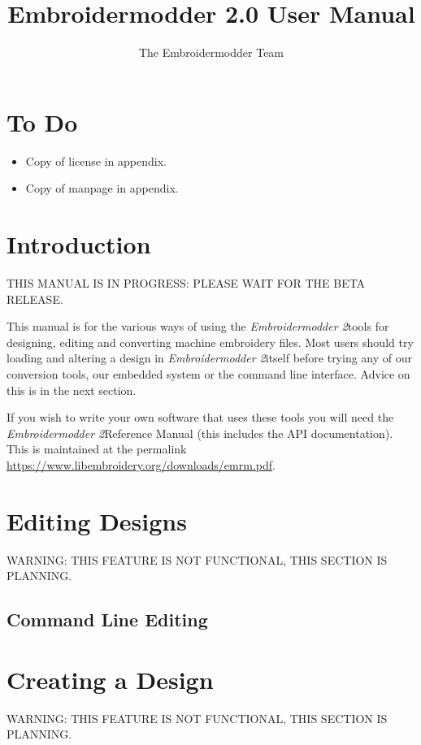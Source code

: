 \documentclass[a4paper,11pt]{article}
\title{Embroidermodder 2.0 User Manual}
\author{The Embroidermodder Team}
\newcommand{\embname}{\emph{Embroidermodder 2}}
\begin{document}
\maketitle

\tableofcontents

\section{To Do}

\begin{itemize}
\item Copy of license in appendix.
\item Copy of manpage in appendix.
\end{itemize}

\section{Introduction}

THIS MANUAL IS IN PROGRESS: PLEASE WAIT FOR THE BETA RELEASE.

This manual is for the various ways of using the \embname tools for designing,
editing and converting machine embroidery files. Most users should try loading and altering a design
in \embname itself before trying any of our conversion tools, our embedded system
or the command line interface. Advice on this is in the next section.

If you wish to write your own
software that uses these tools you will need the \embname Reference Manual (this
includes the API documentation). This is maintained at the permalink
\url{https://www.libembroidery.org/downloads/emrm.pdf}.

\section{Editing Designs}

WARNING: THIS FEATURE IS NOT FUNCTIONAL, THIS SECTION IS PLANNING.

\subsection{Command Line Editing}

\section{Creating a Design}

WARNING: THIS FEATURE IS NOT FUNCTIONAL, THIS SECTION IS PLANNING.
\end{document}
